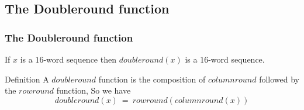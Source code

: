 \subsection{The Doubleround function}

\begin{frame}
\frametitle{The Doubleround function}

If $x$ is a $16$-word sequence then $doubleround(x)$ is a $16$-word sequence.
\begin{block}{Definition}
A ${doubleround}$ function is the composition of $columnround$ followed by the $rowround$ function, So we have 
$$doubleround(x)  \ = \ 
rowround(columnround(x))$$
\end{block}
\end{frame}